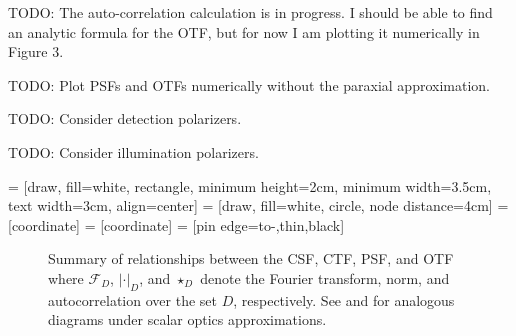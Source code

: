 \documentclass[11pt]{article}
\providecommand{\mb}[1]{\mathbf{#1}}
\providecommand{\ro}[1]{\mathbf{\mathbf{r}}_o}
\providecommand{\so}[1]{\mathbf{\hat{s}}_o}
\providecommand{\rd}[1]{\mathbf{r}_d}
\providecommand{\bs}[1]{\boldsymbol{#1}}
\begin{document}
TODO: The auto-correlation calculation is in progress. I should be able to find an
analytic formula for the OTF, but for now I am plotting it numerically in Figure 3.

TODO: Plot PSFs and OTFs numerically without the paraxial approximation.

TODO: Consider detection polarizers.

TODO: Consider illumination polarizers.

 = [draw, fill=white, rectangle, 
    minimum height=2cm, minimum width=3.5cm, text width=3cm, align=center]
 = [draw, fill=white, circle, node distance=4cm]
 = [coordinate]
 = [coordinate]
 = [pin edge={to-,thin,black}]
\begin{figure}
      \centering
      \captionsetup{width=1.0\linewidth}
      \caption{Summary of relationships between the CSF, CTF, PSF, and OTF where
        $\mathcal{F}_D$, $|\cdot|_D$, and $\star_D$ denote the Fourier
        transform, norm, and autocorrelation over the set $D$, respectively. See
        \cite{goodman1996} and \cite{mertz2009} for analogous diagrams under
        scalar optics approximations.}
    \end{figure}
\end{document}
